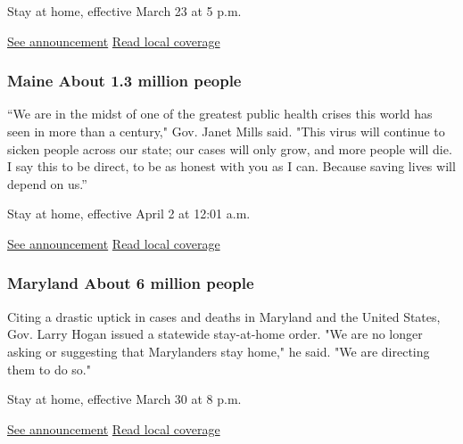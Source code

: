 Stay at home, effective March 23 at 5 p.m.

\href{https://gov.louisiana.gov/assets/Proclamations/2020/JBE-33-2020.pdf}{See
announcement} \textbar{}
\href{https://www.theadvocate.com/baton_rouge/news/coronavirus/article_922869e8-6c6d-11ea-aeee-6b6fd5e8f4bd.html}{Read
local coverage}

\hypertarget{maine-about-13-million-people}{%
\subsubsection{Maine About 1.3 million
people}\label{maine-about-13-million-people}}

``We are in the midst of one of the greatest public health crises this
world has seen in more than a century," Gov. Janet Mills said. "This
virus will continue to sicken people across our state; our cases will
only grow, and more people will die. I say this to be direct, to be as
honest with you as I can. Because saving lives will depend on us.''

Stay at home, effective April 2 at 12:01 a.m.

\href{https://www.maine.gov/governor/mills/sites/maine.gov.governor.mills/files/inline-files/An\%20Order\%20Regarding\%20Further\%20Restrictions\%20on\%20Public\%20Contact\%20and\%20Movement\%2C\%20Schools\%2C\%20Vehicle\%20Travel\%20and\%20Retail\%20Business\%20Operations.pdf}{See
announcement} \textbar{}
\href{https://www.wabi.tv/content/news/Gov-Mills-issues-stay-at-home-order-for-Maine-569260011.html}{Read
local coverage}

\hypertarget{maryland-about-6-million-people}{%
\subsubsection{Maryland About 6 million
people}\label{maryland-about-6-million-people}}

Citing a drastic uptick in cases and deaths in Maryland and the United
States, Gov. Larry Hogan issued a statewide stay-at-home order. "We are
no longer asking or suggesting that Marylanders stay home," he said. "We
are directing them to do so."

Stay at home, effective March 30 at 8 p.m.

\href{https://governor.maryland.gov/2020/03/30/as-covid-19-crisis-escalates-in-capital-region-governor-hogan-issues-stay-at-home-order-effective-tonight/}{See
announcement} \textbar{}
\href{https://www.baltimoresun.com/coronavirus/bs-md-stay-at-home-hogan-covid-19-20200330-pmid22rvirdwbppx4xpgjadoim-story.html}{Read
local coverage}

